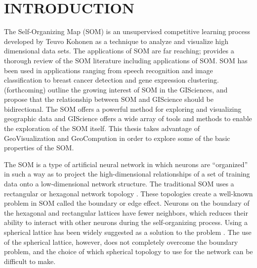 \chapter{INTRODUCTION}
The Self-Organizing Map (SOM) is an unsupervised competitive learning process
developed by Teuvo Kohonen as a technique to analyze and visualize high
dimensional data sets.  The applications of SOM are far reaching;
\cite{Kohonen2000} provides a thorough review of the SOM literature including
applications of SOM.  SOM has been used in applications ranging from speech
recognition and image classification to breast cancer detection and gene
expression clustering.  \citeauthor{skupin07} (forthcoming) outline the growing interest of SOM in
the GISciences, and propose that the relationship between SOM and GIScience
should be bidirectional.  The SOM offers a powerful method for exploring and
visualizing geographic data and GIScience offers a wide array of tools
and methods to enable the exploration of the SOM itself.  This thesis takes
advantage of GeoVisualization and GeoCompution in order to explore some of the basic
properties of the SOM.

The SOM is a type of artificial neural network in which neurons are ``organized''
in such a way as to project the high-dimensional relationships of a set of
training data onto a low-dimensional network structure.  The traditional
SOM uses a rectangular or hexagonal network topology \citep{Kohonen2000}.  These topologies 
create a well-known problem in SOM called the boundary or edge effect.  Neurons on
the boundary of the hexagonal and rectangular lattices have fewer neighbors,
which reduces their ability to interact with other neurons during the
self-organizing process.  Using a spherical lattice has been widely suggested as a
solution to the problem \citep{ritter99, boudjemai2003, sangole03,
Nishio:2006fk, wu2006}. The use of the spherical lattice, however, does not
completely overcome the boundary problem, and the choice of which spherical
topology to use for the network can be difficult to make.

